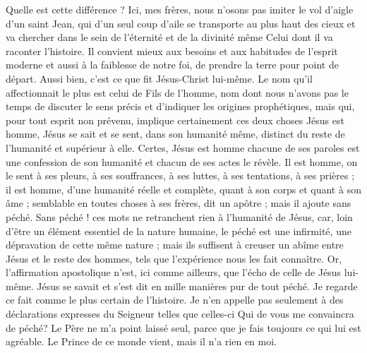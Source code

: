 Quelle est cette différence ? Ici, mes frères, nous n’osons pas imiter le vol d’aigle d’un saint Jean, qui d’un seul coup d’aile se transporte au plus haut des cieux et va chercher dans le sein de l’éternité et de la divinité même Celui dont il va raconter l’histoire. Il convient mieux aux besoins et aux habitudes de l’esprit moderne et aussi à la faiblesse de notre foi, de prendre la terre pour point de départ. Aussi bien, c’est ce que fit Jésus-Christ lui-même. Le nom qu’il affectionnait le plus est celui de Fils de l’homme, nom dont nous n’avons pas le temps de discuter le sens précis et d’indiquer les origines prophétiques, mais qui, pour tout esprit non prévenu, implique certainement ces deux choses\frcolon{} Jésus est homme, Jésus se sait et se sent, dans son humanité même, distinct du reste de l’humanité et supérieur à elle.
Certes, Jésus est homme\frcolon{} chacune de ses paroles est une confession de son humanité et chacun de ses actes le révèle. Il est homme, on le sent à ses pleurs, à ses souffrances, à ses luttes, à ses tentations, à ses prières ; il est homme, d’une humanité réelle et complète, quant à son corps et quant à son âme ; \Og{} semblable en toutes choses à ses frères\Fg{}, dit un apôtre ; mais il ajoute\frcolon{} \Og{} sans péché\Fg{}.
Sans péché ! ces mots ne retranchent rien à l’humanité de Jésus, car, loin d’être un élément essentiel de la nature humaine, le péché est une infirmité, une dépravation de cette même nature ; mais ils suffisent à creuser un abîme entre Jésus et le reste des hommes, tels que l’expérience nous les fait connaître. Or, l’affirmation apostolique n’est, ici comme ailleurs, que l’écho de celle de Jésus lui-même.
Jésus se savait et s’est dit en mille manières pur de tout péché.
Je regarde ce fait comme le plus certain de l’histoire.
Je n’en appelle pas seulement à des déclarations expresses du Seigneur telles que celles-ci\frcolon{} \Og{} Qui de vous me convaincra de péché? \ocadr{} Le Père ne m’a point laissé seul, parce que je fais toujours ce qui lui est agréable. \ocadr{} Le Prince de ce monde vient, mais il n’a rien en moi.\Fg{}

